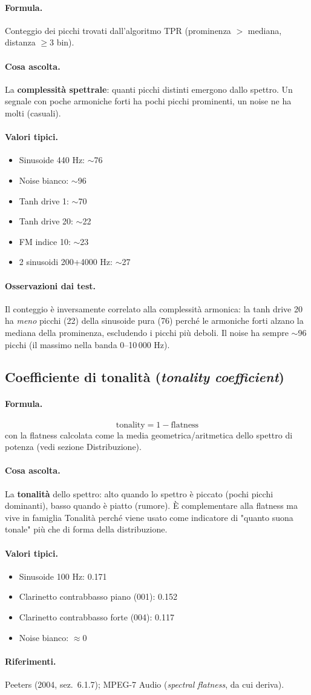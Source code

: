 \documentclass[a4paper,11pt]{article}
\newcommand{\desc}[1]{\subsection{#1}}
\newcommand{\formula}{\paragraph{Formula.}}
\newcommand{\ascolta}{\paragraph{Cosa ascolta.}}
\newcommand{\range}{\paragraph{Valori tipici.}}
\newcommand{\rif}{\paragraph{Riferimenti.}}
\newcommand{\oss}{\paragraph{Osservazioni dai test.}}
\begin{document}
\formula
Conteggio dei picchi trovati dall'algoritmo TPR (prominenza $>$ mediana,
distanza $\geq 3$ bin).

\ascolta
La \textbf{complessità spettrale}: quanti picchi distinti emergono dallo
spettro. Un segnale con poche armoniche forti ha pochi picchi prominenti,
un noise ne ha molti (casuali).

\range
\begin{itemize}[nosep]
  \item Sinusoide 440 Hz: $\sim$76
  \item Noise bianco: $\sim$96
  \item Tanh drive 1: $\sim$70
  \item Tanh drive 20: $\sim$22
  \item FM indice 10: $\sim$23
  \item 2 sinusoidi 200+4000 Hz: $\sim$27
\end{itemize}

\oss Il conteggio è inversamente correlato alla complessità armonica:
la tanh drive 20 ha \emph{meno} picchi (22) della sinusoide pura (76)
perché le armoniche forti alzano la mediana della prominenza, escludendo
i picchi più deboli. Il noise ha sempre $\sim$96 picchi (il massimo
nella banda 0--10\,000 Hz).

\desc{Coefficiente di tonalità (\emph{tonality coefficient})}

\formula
\[
  \text{tonality} = 1 - \text{flatness}
\]
con la flatness calcolata come la media geometrica/aritmetica dello
spettro di potenza (vedi sezione Distribuzione).

\ascolta
La \textbf{tonalità} dello spettro: alto quando lo spettro è piccato
(pochi picchi dominanti), basso quando è piatto (rumore). È
complementare alla flatness ma vive in famiglia Tonalità perché viene
usato come indicatore di "quanto suona tonale" più che di forma della
distribuzione.

\range
\begin{itemize}[nosep]
  \item Sinusoide 100 Hz: 0.171
  \item Clarinetto contrabbasso piano (001): 0.152
  \item Clarinetto contrabbasso forte (004): 0.117
  \item Noise bianco: $\approx 0$
\end{itemize}

\rif Peeters (2004, sez.~6.1.7); MPEG-7 Audio (\emph{spectral
flatness}, da cui deriva).
\end{document}
